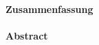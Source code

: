 \begin{titlepage}
	\cleardoublepage
	\normalsize
	\sffamily
	\textbf{Zusammenfassung}\\[0.2cm]
	\normalfont
	\\[0.5cm]
	\newpage
	\sffamily
	\textbf{Abstract}\\[0.2cm]
	\normalfont
	
	
	
	\clearpage
	\newpage
\end{titlepage}